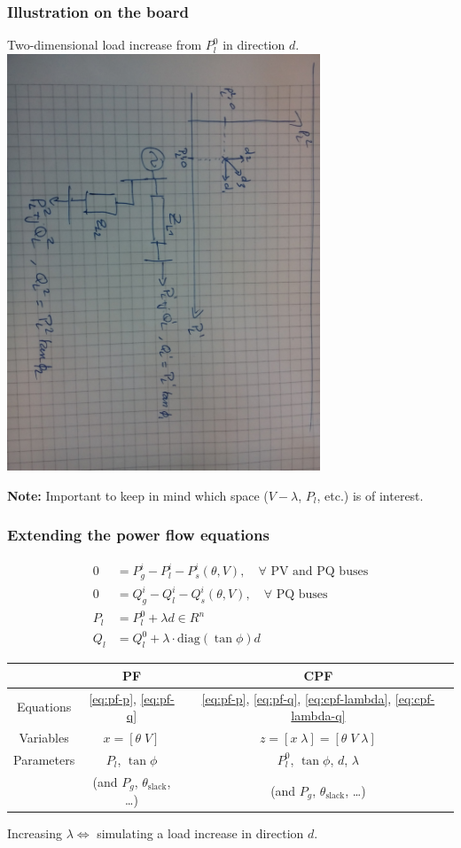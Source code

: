 \documentclass{beamer}
\begin{document}
\begin{frame}
  \frametitle{Illustration on the board}
  Two-dimensional load increase from $P_l^0$ in direction $d$.
  \includegraphics[angle=90,width=0.7\textwidth]{Figs/LoadIncrease.jpg}

\textbf{Note:} Important to keep in mind which space ($V-\lambda$, $P_l$, etc.) is of interest.
\end{frame}

\begin{frame}
  \frametitle{Extending the power flow equations}
\begin{align}
      0 &= P_g^i - P_l^i - P_s^i(\theta,V), \quad \forall \text{ PV and PQ buses} \label{eq:pf-p} \\
      0 &= Q_g^i - Q_l^i - Q_s^i(\theta,V), \quad \forall \text{ PQ buses} \label{eq:pf-q}\\
      P_l &= P_l^0 + \lambda d \in R^n \label{eq:cpf-lambda} \\
      Q_l &= Q_l^0 + \lambda \cdot \text{diag}(\tan \phi) d \label{eq:cpf-lambda-q}
    \end{align}
    \begin{center}
    \begin{tabular}{ccc}
    \toprule
      & PF & CPF \\
    \midrule
    Equations & \eqref{eq:pf-p}, \eqref{eq:pf-q} & \eqref{eq:pf-p}, \eqref{eq:pf-q}, \eqref{eq:cpf-lambda}, \eqref{eq:cpf-lambda-q}\\
    Variables & $x = [\theta \; V]$ & $z = [x \; \lambda] = [\theta \; V \; \lambda]$ \\
    Parameters & $P_l$, $\tan \phi$ & $P_l^0$, $\tan \phi$, $d$, $\lambda$ \\
     & (and $P_g$, $\theta_{\text{slack}}$, \ldots) & (and $P_g$, $\theta_{\text{slack}}$, \ldots) \\
    \bottomrule
    \end{tabular}  
    \end{center}
Increasing $\lambda \Leftrightarrow$ simulating a load increase in direction $d$.
\end{frame}
\end{document}
